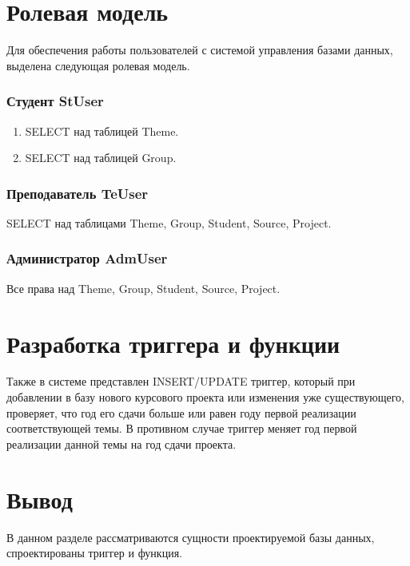 \section{Ролевая модель}

Для обеспечения работы пользователей с системой управления базами данных, выделена
следующая ролевая модель.

\subsubsection*{Студент StUser}

\begin{enumerate}
	\item SELECT над таблицей Theme.
	\item SELECT над таблицей Group.
\end{enumerate}


\subsubsection*{Преподаватель TeUser}

	SELECT над таблицами Theme, Group, Student, Source, Project.



\subsubsection*{Администратор AdmUser}

	Все права над Theme, Group, Student, Source, Project.


\section{Разработка триггера и функции}

Также в системе представлен INSERT/UPDATE триггер, который при добавлении в базу нового курсового проекта или изменения уже существующего, проверяет, что год его сдачи больше или равен году первой реализации соответствующей темы. В противном случае триггер меняет год первой реализации данной темы на год сдачи проекта.


\section{Вывод}
В данном разделе рассматриваются сущности проектируемой базы данных, спроектированы триггер и функция.